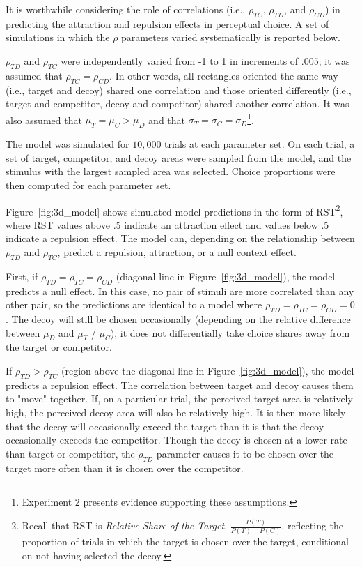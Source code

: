 It is worthwhile considering the role of correlations (i.e., $\rho_{TC}$, $\rho_{TD}$, and $\rho_{CD}$) in predicting the attraction and repulsion effects in perceptual choice. A set of simulations in which the $\rho$ parameters varied systematically is reported below. 

$\rho_{TD}$ and $\rho_{TC}$ were independently varied from -1 to 1 in increments of $.005$; it was assumed that $\rho_{TC}=\rho_{CD}$. In other words, all rectangles oriented the same way (i.e., target and decoy) shared one correlation and those oriented differently (i.e., target and competitor, decoy and competitor) shared another correlation. It was also assumed that $\mu_{T}=\mu_{C}>\mu_{D}$ and that $\sigma_{T}=\sigma_{C}=\sigma_{D}$\footnote{Experiment 2 presents evidence supporting these assumptions.}. 

The model was simulated for $10,000$ trials at each parameter set. On each trial, a set of target, competitor, and decoy areas were sampled from the model, and the stimulus with the largest sampled area was selected. Choice proportions were then computed for each parameter set.

Figure~\ref{fig:3d_model} shows simulated model predictions in the form of RST\footnote{Recall that RST is \textit{Relative Share of the Target}, $\frac{P(T)}{P(T)+P(C)}$, reflecting the proportion of trials in which the target is chosen over the target, conditional on not having selected the decoy.}, where RST values above .5 indicate an attraction effect and values below .5 indicate a repulsion effect. The model can, depending on the relationship between $\rho_{TD}$ and $\rho_{TC}$, predict a repulsion, attraction, or a null context effect. 

First, if $\rho_{TD}=\rho_{TC}=\rho_{CD}$ (diagonal line in Figure~\ref{fig:3d_model}), the model predicts a null effect. In this case, no pair of stimuli are more correlated than any other pair, so the predictions are identical to a model where $\rho_{TD}=\rho_{TC}=\rho_{CD}=0$. The decoy will still be chosen occasionally (depending on the relative difference between $\mu_{D}$ and $\mu_{T}$ / $\mu_{C}$), it does not differentially take choice shares away from the target or competitor. 

If $\rho_{TD}>\rho_{TC}$ (region above the diagonal line in Figure~\ref{fig:3d_model}), the model predicts a repulsion effect. The correlation between target and decoy causes them to "move" together. If, on a particular trial, the perceived target area is relatively high, the perceived decoy area will also be relatively high. It is then more likely that the decoy will occasionally exceed the target than it is that the decoy occasionally exceeds the competitor. Though the decoy is chosen at a lower rate than target or competitor, the $\rho_{TD}$ parameter causes it to be chosen over the target more often than it is chosen over the competitor.  

